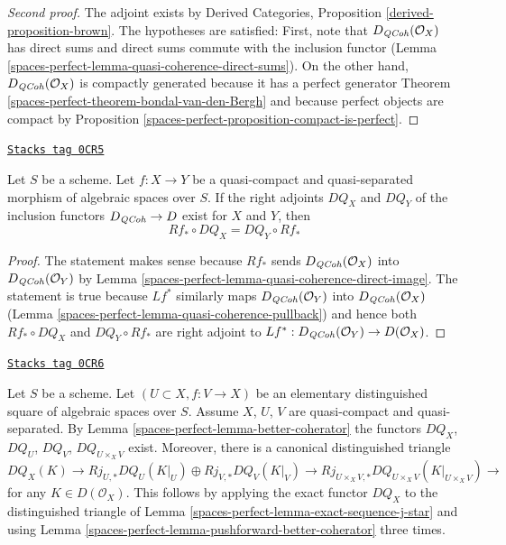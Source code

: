 \begin{proof}[Second proof]
The adjoint exists by Derived Categories, Proposition
\ref{derived-proposition-brown}. The hypotheses are satisfied:
First, note that $D_{\mathit{QCoh}}(\mathcal{O}_X)$ has direct sums
and direct sums commute with the inclusion functor
(Lemma \ref{spaces-perfect-lemma-quasi-coherence-direct-sums}).
On the other hand, $D_{\mathit{QCoh}}(\mathcal{O}_X)$
is compactly generated because it has a perfect
generator Theorem \ref{spaces-perfect-theorem-bondal-van-den-Bergh}
and because perfect objects are compact by
Proposition \ref{spaces-perfect-proposition-compact-is-perfect}.
\end{proof}

\begin{lemma}
\label{spaces-perfect-lemma-pushforward-better-coherator}
\href{https://stacks.math.columbia.edu/tag/0CR5}{\texttt{Stacks tag 0CR5}}

Let $S$ be a scheme.
Let $f : X \to Y$ be a quasi-compact and quasi-separated
morphism of algebraic spaces over $S$.
If the right adjoints $DQ_X$ and $DQ_Y$
of the inclusion functors $D_{\mathit{QCoh}} \to D$ exist for $X$ and $Y$, then
$$
Rf_* \circ DQ_X = DQ_Y \circ Rf_*
$$
\end{lemma}

\begin{proof}
The statement makes sense because $Rf_*$ sends
$D_{\mathit{QCoh}}(\mathcal{O}_X)$ into $D_{\mathit{QCoh}}(\mathcal{O}_Y)$ by
Lemma \ref{spaces-perfect-lemma-quasi-coherence-direct-image}.
The statement is true because $Lf^*$ similarly maps
$D_{\mathit{QCoh}}(\mathcal{O}_Y)$ into $D_{\mathit{QCoh}}(\mathcal{O}_X)$
(Lemma \ref{spaces-perfect-lemma-quasi-coherence-pullback})
and hence both $Rf_* \circ DQ_X$ and $DQ_Y \circ Rf_*$
are right adjoint to $Lf^* : D_{\mathit{QCoh}}(\mathcal{O}_Y) \to D(\mathcal{O}_X)$.
\end{proof}

\begin{remark}
\label{spaces-perfect-remark-explain-consequence}
\href{https://stacks.math.columbia.edu/tag/0CR6}{\texttt{Stacks tag 0CR6}}

Let $S$ be a scheme. Let $(U \subset X, f : V \to X)$ be an
elementary distinguished square of algebraic spaces over $S$.
Assume $X$, $U$, $V$ are quasi-compact and quasi-separated.
By Lemma \ref{spaces-perfect-lemma-better-coherator} the functors
$DQ_X$, $DQ_U$, $DQ_V$, $DQ_{U \times_X V}$ exist. Moreover, there is a
canonical distinguished triangle
$$
DQ_X(K) \to Rj_{U, *}DQ_U(K|_U) \oplus Rj_{V, *}DQ_V(K|_V)
\to Rj_{U \times_X V, *}DQ_{U \times_X V}(K|_{U \times_X V}) \to
$$
for any $K \in D(\mathcal{O}_X)$. This follows by applying the
exact functor $DQ_X$ to the distinguished triangle of
Lemma \ref{spaces-perfect-lemma-exact-sequence-j-star}
and using Lemma \ref{spaces-perfect-lemma-pushforward-better-coherator} three times.
\end{remark}

